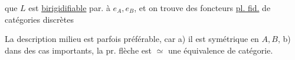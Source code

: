   que $L$ est \uline{birigidifiable} par. à $e_A,e_B$, et on trouve des foncteurs \uline{pl. fid.} de catégories discrètes

La description   milieu est parfois préférable, car a) il est  symétrique en $A,B$, b) dans des cas importants, la pr. flèche est $\simeq$ une équivalence de catégorie.

